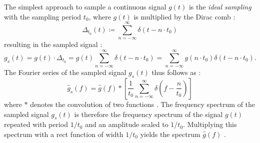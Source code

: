 The simplest approach to sample a continuous signal $g\left(t\right)$ is the \emph{ideal sampling} with the sampling period $t_0$, where $g\left(t\right)$ is multiplied by the Dirac comb \cite{engelberg2008,ceschi2017}:
\begin{equation}
	{\Delta}_{t_0} \left(t\right) \coloneqq \sum_{n = -\infty}^{\infty} \delta\left(t - n \cdot t_0\right)
\end{equation}
resulting in the sampled signal \cite{engelberg2008,ceschi2017}:
\begin{equation}
	g_s\left(t\right) = g\left(t\right) \cdot {\Delta}_{t_0} = g\left(t\right) \sum_{n = -\infty}^{\infty} \delta\left(t - n \cdot t_0\right) = \sum_{n = -\infty}^{\infty}g\left(n \cdot t_0\right)\delta\left(t - n \cdot t_0\right).
\end{equation}
The Fourier series of the sampled signal $g_s\left(t\right)$ thus follows as \cite{engelberg2008,ceschi2017}:
\begin{equation}
	\hat{g}_s\left(f\right) = \hat{g}\left(f\right) * \left[\frac{1}{t_0} \sum_{n = -\infty}^{\infty}\delta\left(f - \frac{n}{t_0}\right)\right]
\end{equation}
where $*$ denotes the convolution of two functions \cite{engelberg2008,ceschi2017}. The frequency spectrum of the sampled signal $g_s\left(t\right)$ is therefore the frequency spectrum of the signal $g\left(t\right)$ repeated with period $1/t_0$ and an amplitude scaled to $1/t_0$. Multiplying this spectrum with a rect function of width $1/t_0$ yields the spectrum $\hat{g}\left(f\right)$ \cite{engelberg2008,ceschi2017}.

